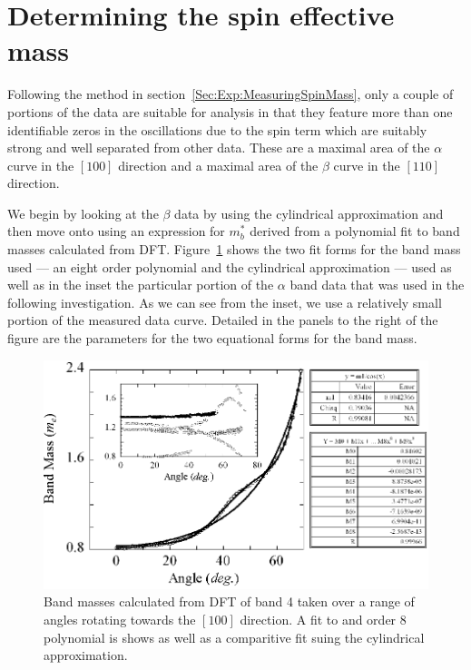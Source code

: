
\section{Determining the spin effective mass}

Following the method in section~\ref{Sec:Exp:MeasuringSpinMass}, only a couple of portions of the data are suitable for analysis in that they feature more than one identifiable zeros in the oscillations due to the spin term which are suitably strong and well separated from other data. These are a maximal area of the $\alpha$ curve in the $[100]$ direction and a maximal area of the $\beta$ curve in the $[110]$ direction.

We begin by looking at the $\beta$ data by using the cylindrical approximation and then move onto using an expression for $m^*_b$ derived from a polynomial fit to band masses calculated from \ac{DFT}. Figure~\ref{Fig:ResD:DFTBandMassBand4} shows the two fit forms for the band mass used --- an eight order polynomial and the cylindrical approximation --- used as well as in the inset the particular portion of the $\alpha$ band data that was used in the following investigation. As we can see from the inset, we use a relatively small portion of the measured data curve. Detailed in the panels to the right of the figure are the parameters for the two equational forms for the band mass.
\begin{figure}[htbp]
    \begin{center}
        \includegraphics[scale=0.8]{Chapter-dHvABaFe2P2/Figures/Mass/DFTBandMassBand4/DFTBandMassBand4}
        \caption{Band masses calculated from \ac{DFT} of band 4 taken over a range of angles rotating towards the $[100]$ direction. A fit to and order 8 polynomial is shows as well as a comparitive fit suing the cylindrical approximation.}
        \label{Fig:ResD:DFTBandMassBand4}
    \end{center}
\end{figure}
